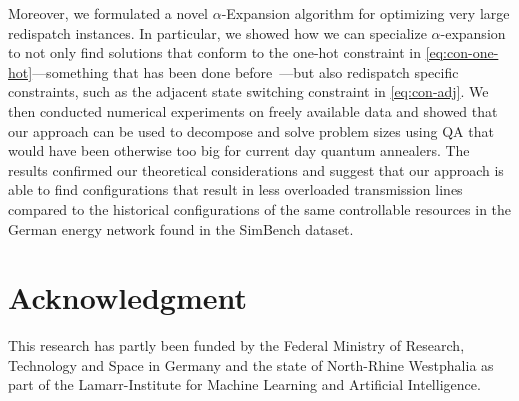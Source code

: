 \documentclass[conference]{IEEEtran}
\begin{document}
Moreover, we formulated a novel $\alpha$-Expansion algorithm for
optimizing very large redispatch instances. In particular, we showed how
we can specialize $\alpha$-expansion to not only find solutions that
conform to the one-hot constraint in \cref{eq:con-one-hot}---something
that has been done before~\cite{benkner2021,gerlach2023}---but also
redispatch specific constraints, such as the adjacent state switching
constraint in \cref{eq:con-adj}. We then conducted numerical experiments
on freely available data and showed that our approach can be used to
decompose and solve problem sizes using QA that would have been
otherwise too big for current day quantum annealers. The results
confirmed our theoretical considerations and suggest that our approach
is able to find configurations that result in less overloaded
transmission lines compared to the historical configurations of the same
controllable resources in the German energy network found in the
SimBench dataset.

\section*{Acknowledgment}
This research has partly been funded by the Federal Ministry of
Research, Technology and Space in Germany and the state of North-Rhine
Westphalia as part of the Lamarr-Institute for Machine Learning and
Artificial Intelligence.





\end{document}

